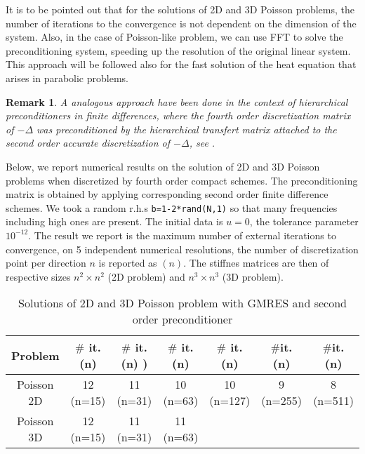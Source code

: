 \documentclass[11pt]{article}
\newtheorem{remark}[theorem]{Remark}
\begin{document}
{It is to be pointed out that for the solutions of 2D and 3D Poisson problems,  the number of iterations to  the convergence is not dependent on the dimension of the system. Also, in the case of Poisson-like problem, we can use FFT to solve the preconditioning system, speeding up the resolution of the original linear system. This approach will be followed also  for the fast solution of the heat equation that arises in parabolic problems.
\begin{remark}
A analogous approach have been done in the context of hierarchical preconditioners in finite differences, where the fourth order discretization matrix of $-\Delta$ was preconditioned by the hierarchical transfert matrix attached to the second order accurate discretization of $-\Delta$, see \cite{ChehabCS}.
\end{remark}

Below, we report numerical results on the solution of 2D and 3D Poisson problems when discretized by fourth order compact schemes. The preconditioning matrix is obtained by applying  corresponding second order finite difference schemes. We took a random r.h.s {\tt b=1-2*rand(N,1)} so that many frequencies including high ones are present. The initial data is $u=0$, the tolerance parameter $10^{-12}$. The result we report is the maximum number of external iterations to convergence, on 5 independent numerical resolutions, the number of discretization point per direction $n$  is reported as $(n)$.   The stiffnes matrices are then of respective sizes $n^2\times n^2$ (2D problem) and
$n^3\times n^3$ (3D problem).

\begin{table}[!h]
\begin{center}

\begin{tabular}{|c||c|c|c|c|c|c|}
\hline 
 Problem & $\#$ it. (n) &  $\#$ it. (n) ) & $\#$ it. (n) & $\#$ it. (n) & $\#$it. (n) & $\#$it. (n)  \\
 \hline
 Poisson 2D & 12 (n=15) &  11  (n=31) &  10 (n=63)  & 10 (n=127) & 9 (n=255) & 8 (n=511)\\
 \hline
 Poisson 3D & 12 (n=15) &  11  (n=31) &  11 (n=63) & & &\\
\hline 
\end{tabular} 
\caption{Solutions of 2D and 3D Poisson problem with GMRES and second order preconditioner}
\label{PrecondPoisson}
\end{center}
\end{table}

}
\end{document}
